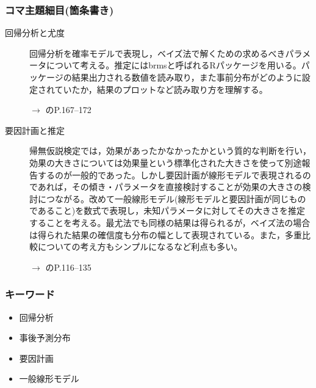 \subsubsection{コマ主題細目(箇条書き)}
\begin{description}
\item[回帰分析と尤度]回帰分析を確率モデルで表現し，ベイズ法で解くための求めるべきパラメータについて考える。推定にはbrmsと呼ばれるRパッケージを用いる。パッケージの結果出力される数値を読み取り，また事前分布がどのように設定されていたか，結果のプロットなど読み取り方を理解する。
\begin{flushright}
    $\to$ \citet{馬場201907}のP.167--172
\end{flushright}


\item[要因計画と推定]帰無仮説検定では，効果があったかなかったかという質的な判断を行い，効果の大きさについては効果量という標準化された大きさを使って別途報告するのが一般的であった。しかし要因計画が線形モデルで表現されるのであれば，その傾き・パラメータを直接検討することが効果の大きさの検討につながる。改めて一般線形モデル(線形モデルと要因計画が同じものであること)を数式で表現し，未知パラメータに対してその大きさを推定することを考える。最尤法でも同様の結果は得られるが，ベイズ法の場合は得られた結果の確信度も分布の幅として表現されている。また，多重比較についての考え方もシンプルになるなど利点も多い。
\begin{flushright}
    $\to$ \citet{豊田201606}のP.116--135
\end{flushright}


\end{description}
\subsubsection{キーワード}
\begin{itemize}
\item 回帰分析
\item 事後予測分布
\item 要因計画
\item 一般線形モデル
\end{itemize}
